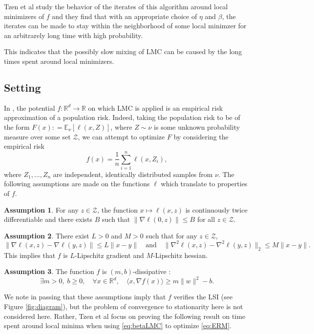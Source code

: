 \documentclass[11pt,twoside]{article}
\theoremstyle{definition}
\newtheorem{assumption}{Assumption}
\newcommand{\E}{\mathbb{E}}
\newcommand{\R}{\mathbb{R}}
\begin{document}
Tzen et al study the behavior of the iterates of this algorithm around local minimizers of $f$ and they find that with an appropriate choice of $\eta$ and $\beta$, the iterates can be made to stay within the neighborhood of some local minimzer for an arbitrarely long time with high probability.

This indicates that the possibly slow mixing of LMC can be caused by the long times spent around local minimizers.


\subsection{Setting}

In \cite{tzen_local_2018}, the potential $f: \R^d \rightarrow \R$ on which LMC is applied is an empirical risk approximation of a population risk. Indeed, taking the population risk to be of the form
\(
F(x) : = \E_\nu [\ell(x, Z)]
\), where $Z \sim \nu$ is some unknown probability measure over some set $\mathcal{Z}$, we can attempt to optimize $F$ by considering the empirical risk
\begin{equation}
f(x) = \frac{1}{n} \sum_{i=1}^{n}\ell(x, Z_i),
\label{eq:ERM}
\end{equation}
where $Z_1, \dots, Z_n$ are independent, identically distributed samples from $\nu$. The following assumptions are made on the functions $\ell$ which translate to properties of $f$.
\begin{assumption}
  For any $z \in \mathcal{Z}$, the function $x \mapsto \ell(x, z)$ is continuously twice differentiable and there exists $B$ such that $\| \nabla \ell (0, z) \| \leq B$ for all $z \in \mathcal{Z}$.
\end{assumption}
\begin{assumption}
  There exist $L > 0$ and $M> 0$ such that for any $z \in \mathcal{Z}$,
  \[
  \| \nabla \ell(x, z) - \nabla \ell(y, z)\| \leq L \|x - y\| \quad \text{and} \quad \| \nabla^2 \ell(x, z) - \nabla^2 \ell(y, z)\|_2 \leq M \|x - y\|.
  \]
  This implies that $f$ is $L$-Lipschitz gradient and $M$-Lipschitz hessian.
\end{assumption}
\begin{assumption}
  The function $f$ is $(m, b)$-dissipative :
  \[
  \exists m>0, \; b\geq 0, \quad \forall x \in \R^d, \quad \langle x, \nabla f(x) \rangle \geq m \|w\|^2 - b.
  \]
\end{assumption}

We note in passing that these assumptions imply that $f$ verifies the LSI (see Figure \ref{fig:diagram}), but the problem of convergence to stationarity here is not considered here. Rather, Tzen et al focus on proving the following result on time spent around local minima when using \eqref{eq:betaLMC} to optimize \eqref{eq:ERM}.
\end{document}
